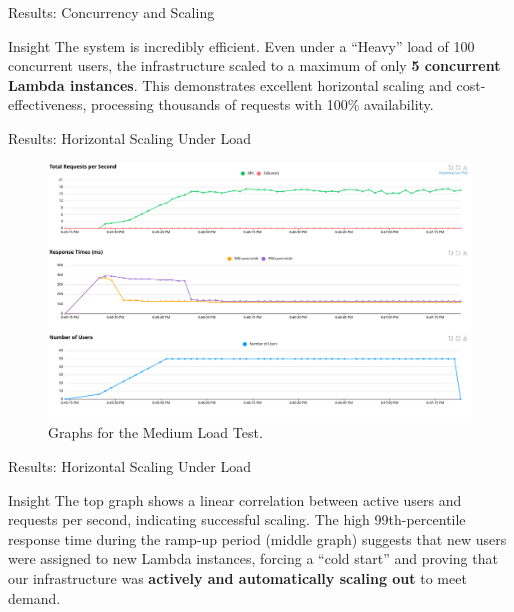 \documentclass{beamer}
\begin{document}
\begin{frame}{Results: Concurrency and Scaling}
    \begin{block}{Insight}
        The system is incredibly efficient. Even under a ``Heavy'' load of 100 concurrent users, the infrastructure scaled to a maximum of only \textbf{5 concurrent Lambda instances}. This demonstrates excellent horizontal scaling and cost-effectiveness, processing thousands of requests with 100\% availability.
    \end{block}
\end{frame}

\begin{frame}{Results: Horizontal Scaling Under Load}
    \begin{figure}[H]
        \centering
        \includegraphics[width=\textwidth]{medium_load_test.png}
        \caption{Graphs for the Medium Load Test.}
    \end{figure}
\end{frame}

\begin{frame}{Results: Horizontal Scaling Under Load}
    \begin{block}{Insight}
        The top graph shows a linear correlation between active users and requests per second, indicating successful scaling. The high 99th-percentile response time during the ramp-up period (middle graph) suggests that new users were assigned to new Lambda instances, forcing a ``cold start'' and proving that our infrastructure was \textbf{actively and automatically scaling out} to meet demand.
    \end{block}
\end{frame}
\end{document}
